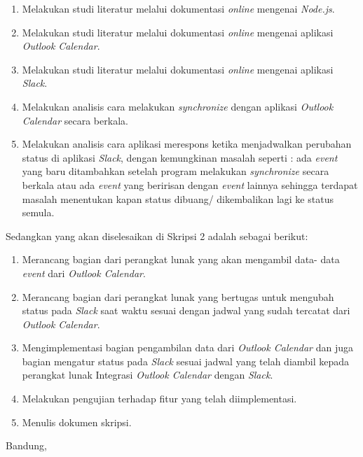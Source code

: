 \documentclass[a4paper,twoside]{article}
\begin{document}
\begin{enumerate}
\item Melakukan studi literatur melalui dokumentasi \textit{online} mengenai \textit{Node.js}.
		\item Melakukan studi literatur melalui dokumentasi \textit{online} mengenai aplikasi \textit{Outlook Calendar}.
		\item Melakukan studi literatur melalui dokumentasi \textit{online} mengenai aplikasi \textit{Slack}. 
		\item Melakukan analisis cara melakukan \textit{synchronize} dengan aplikasi \textit{Outlook Calendar} secara berkala.
		\item Melakukan analisis cara aplikasi merespons ketika menjadwalkan perubahan status di aplikasi \textit{Slack}, dengan kemungkinan masalah seperti : ada \textit{event} yang baru ditambahkan setelah program melakukan \textit{synchronize} secara berkala atau ada \textit{event} yang beririsan dengan \textit{event} lainnya sehingga terdapat masalah menentukan kapan status dibuang/ dikembalikan lagi ke status semula. 
\end{enumerate}

Sedangkan yang akan diselesaikan di Skripsi 2 adalah sebagai berikut:

\begin{enumerate}
\item Merancang bagian dari perangkat lunak yang akan mengambil data- data \textit{event} dari \textit{Outlook Calendar}. 
		\item Merancang bagian dari perangkat lunak yang bertugas untuk mengubah status pada \textit{Slack} saat waktu sesuai dengan jadwal yang sudah tercatat dari \textit{Outlook Calendar}.
		\item Mengimplementasi bagian pengambilan data dari \textit{Outlook Calendar} dan juga bagian mengatur status pada \textit{Slack} sesuai jadwal yang telah diambil kepada perangkat lunak Integrasi \textit{Outlook Calendar} dengan \textit{Slack}.
		\item Melakukan pengujian terhadap fitur yang telah diimplementasi.
		\item Menulis dokumen skripsi.
\end{enumerate}

\vspace{1cm}
\centering Bandung, \tanggal\\
\vspace{2cm} \nama \\ 
\vspace{1cm}
\end{document}
